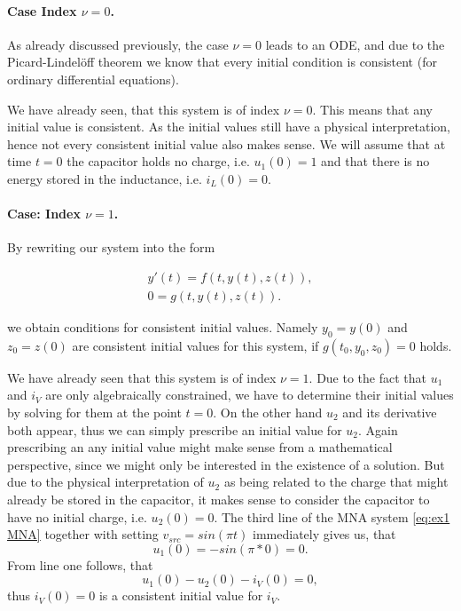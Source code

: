 
\paragraph{Case Index $\nu = 0$. } 
As already discussed previously, the case $\nu = 0$ leads to an ODE, and due to the Picard-Lindelöff theorem  we know that every initial condition is consistent (for ordinary differential equations).

\begin{example2}
	We have already seen, that this system is of index $\nu = 0$. This means that any initial value is consistent. As the initial values still have a physical interpretation, hence not every consistent initial value also makes sense. We will assume that at time $t=0$ the capacitor holds no charge, i.e. $u_1(0) = 1$ and that there is no energy stored in the inductance, i.e. $i_L(0) = 0$.
\end{example2}


\paragraph{Case: Index $\nu = 1$.}

By rewriting our system into the form

\begin{align*}
	y'(t) = f(t,y(t),z(t)), \\
	0 = g(t,y(t),z(t)).
\end{align*}

we obtain conditions for consistent initial values. Namely $y_0 = y(0)$ and $z_0 = z(0)$ are consistent initial values for this system, if $g(t_0, y_0, z_0) = 0$ holds.

\begin{example1}
	We have already seen that this system is of index $\nu=1$. Due to the fact that $u_1$ and $i_V$ are only algebraically constrained, we have to determine their initial values by solving for them at the point $t=0$. On the other hand $u_2$ and its derivative both appear, thus we can simply prescribe an initial value for $u_2$. Again prescribing an any initial value might make sense from a mathematical perspective, since we might only be interested in the existence of a solution. But due to the physical interpretation of $u_2$ as being related to the charge that might already be stored in the capacitor, it makes sense to consider the capacitor to have no initial charge, i.e. $u_2(0) = 0$.
	The third line of the MNA system \eqref{eq:ex1 MNA} together with setting $v_{src} = sin(\pi t)$ immediately gives us, that
	\begin{displaymath}
		u_1(0) = -sin(\pi * 0) = 0.
	\end{displaymath}
	From line one follows, that
	\begin{displaymath}
		u_1(0) - u_2(0) - i_V(0) = 0,
	\end{displaymath}
	thus $i_V(0) = 0$ is a consistent initial value for $i_V$.
\end{example1}

